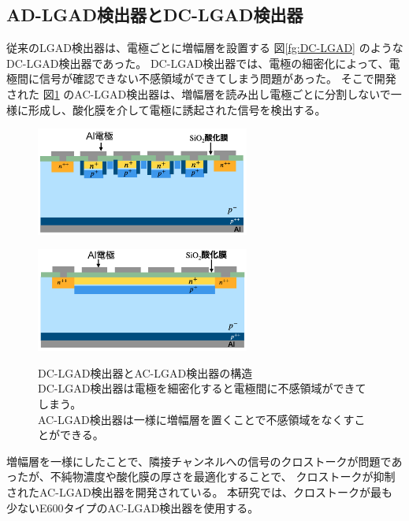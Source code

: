 \subsection{AD-LGAD検出器とDC-LGAD検出器}
従来のLGAD検出器は、電極ごとに増幅層を設置する 図\ref{fg:DC-LGAD} のようなDC-LGAD検出器であった。
DC-LGAD検出器では、電極の細密化によって、電極間に信号が確認できない不感領域ができてしまう問題があった。
そこで開発された 図\ref{fg:AC-LGAD} のAC-LGAD検出器は、増幅層を読み出し電極ごとに分割しないで一様に形成し、酸化膜を介して電極に誘起された信号を検出する。
\begin{figure}[h]
    \begin{minipage}[b]{0.5\linewidth}
        \centering
        \includegraphics[width=7cm]{fig/ch3/DC-LGAD.png}
        \label{fg:DC-LGAD}
    \end{minipage}
    \begin{minipage}[b]{0.5\linewidth}
        \centering
        \includegraphics[width=7cm]{fig/ch3/AC-LGAD.png}
        \label{fg:AC-LGAD}
    \end{minipage}
    \caption[DC-LGAD検出器とAC-LGAD検出器の構造]{DC-LGAD検出器とAC-LGAD検出器の構造\\DC-LGAD検出器は電極を細密化すると電極間に不感領域ができてしまう。\\AC-LGAD検出器は一様に増幅層を置くことで不感領域をなくすことができる。}
\end{figure}
増幅層を一様にしたことで、隣接チャンネルへの信号のクロストークが問題であったが、不純物濃度や酸化膜の厚さを最適化することで、
クロストークが抑制されたAC-LGAD検出器を開発されている\cite{kita2023development}。
本研究では、クロストークが最も少ないE600タイプのAC-LGAD検出器を使用する。

